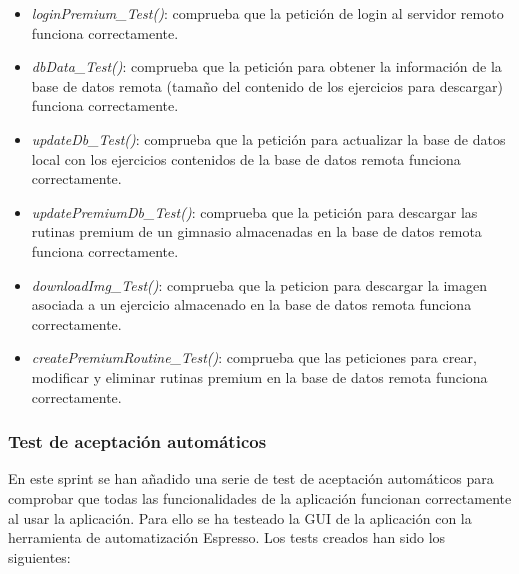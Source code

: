 \documentclass[11pt,a4paper]{report}
\begin{document}
\begin{itemize}
	\item \textit{loginPremium\_Test()}: comprueba que la petición de login al servidor remoto funciona correctamente.

	\item \textit{dbData\_Test()}: comprueba que la petición para obtener la información de la base de datos remota (tamaño del contenido de los ejercicios para descargar) funciona correctamente.

	\item \textit{updateDb\_Test()}: comprueba que la petición para actualizar la base de datos local con los ejercicios contenidos de la base de datos remota funciona correctamente.

	\item \textit{updatePremiumDb\_Test()}: comprueba que la petición para descargar las rutinas premium de un gimnasio almacenadas en la base de datos remota funciona correctamente.

	\item \textit{downloadImg\_Test()}: comprueba que la peticion para descargar la imagen asociada a un ejercicio almacenado en la base de datos remota funciona correctamente.

	\item \textit{createPremiumRoutine\_Test()}: comprueba que las peticiones para crear, modificar y eliminar rutinas premium en la base de datos remota funciona correctamente.

\end{itemize}
\subsubsection{Test de aceptación automáticos}
En este sprint se han añadido una serie de test de aceptación automáticos para comprobar que todas las funcionalidades de la aplicación funcionan correctamente al usar la aplicación. Para ello se ha testeado la GUI de la aplicación con la herramienta de automatización Espresso. Los tests creados han sido los siguientes:
\end{document}
